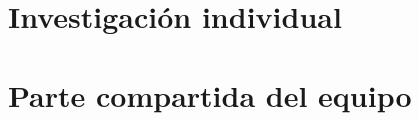 \documentclass[11pt,letterpaper,DIV=12]{scrartcl}
\begin{document}


\part{Investigación individual}


\part{Parte compartida del equipo}


\printbibliography
\end{document}
